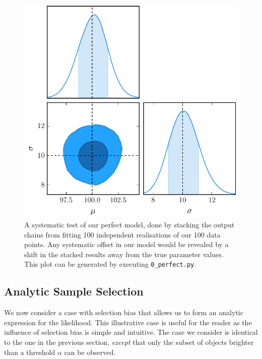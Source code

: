 \documentclass[a4paper,fleqn,usenatbib]{mnras}
\begin{document}
\begin{figure}
	\begin{center}
		\includegraphics[width=\columnwidth]{fig_0_perfect.pdf}
	\end{center}
	\caption{A systematic test of our perfect model, done by stacking the output chains from fitting 100 independent realisations of our 100 data points. Any systematic offset in our model would be revealed by a shift in the stacked results away from the true parameter values. This plot can be generated by executing  \mbox{\texttt{0\_perfect.py}}.}
	\label{fig:perfect}
\end{figure}









\subsection{Analytic Sample Selection}
\label{sec:imperfect}

We now consider a case with selection bias that allows us to form an analytic expression for the likelihood.  This illustrative case is useful for the reader as the influence of selection bias is simple and intuitive. The case we consider is identical to the one in the previous section, \textit{except} that only the subset of objects brighter than a threshold $\alpha$ can be observed.
\end{document}
